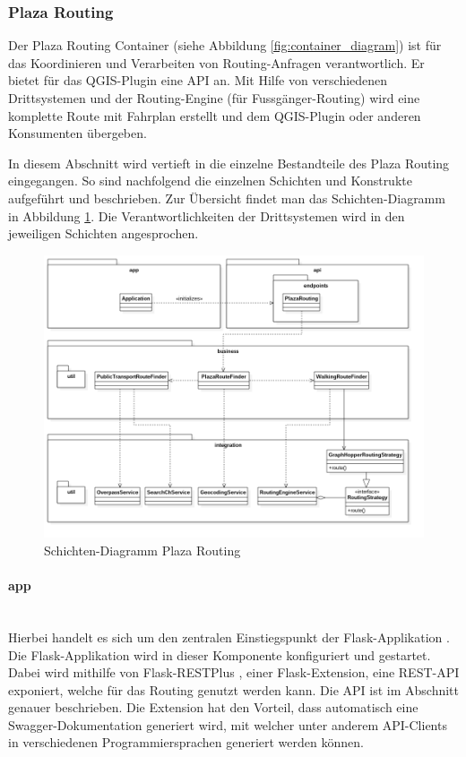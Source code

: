 \subsubsection{Plaza Routing}
\label{architektur:Plaza Routing}
Der Plaza Routing Container (siehe Abbildung \ref{fig:container_diagram}) ist für das Koordinieren und Verarbeiten von Routing-Anfragen verantwortlich. Er bietet für das QGIS-Plugin eine API an. Mit Hilfe von verschiedenen Drittsystemen und der Routing-Engine (für Fussgänger-Routing) wird eine komplette Route mit Fahrplan erstellt und dem QGIS-Plugin oder anderen Konsumenten übergeben.

In diesem Abschnitt wird vertieft in die einzelne Bestandteile des Plaza Routing eingegangen. So sind nachfolgend die einzelnen Schichten und Konstrukte aufgeführt und beschrieben. Zur Übersicht findet man das Schichten-Diagramm in Abbildung \ref{fig:package_diagram_plaza_routing}. Die Verantwortlichkeiten der Drittsystemen wird in den jeweiligen Schichten angesprochen.

\begin{figure}[ht]
\centering
\includegraphics[width=1\linewidth]{projectdoc/img/package_diagram}
\caption[Schichten-Diagramm Plaza Routing]{Schichten-Diagramm Plaza Routing}
\label{fig:package_diagram_plaza_routing}
\end{figure}

\paragraph{app}\label{architektur:app-layer}~\\
Hierbei handelt es sich um den zentralen Einstiegspunkt der Flask-Applikation \cite{flask}. Die Flask-Applikation wird in dieser Komponente konfiguriert und gestartet. Dabei wird mithilfe von Flask-RESTPlus \cite{flask-restplus}, einer Flask-Extension, eine \ac{REST}-\ac{API} exponiert, welche für das Routing genutzt werden kann. Die \ac{API} ist im Abschnitt  genauer beschrieben.
Die Extension hat den Vorteil, dass automatisch eine Swagger-Dokumentation \cite{swagger} generiert wird, mit welcher unter anderem \ac{API}-Clients in verschiedenen Programmiersprachen generiert werden können.  

